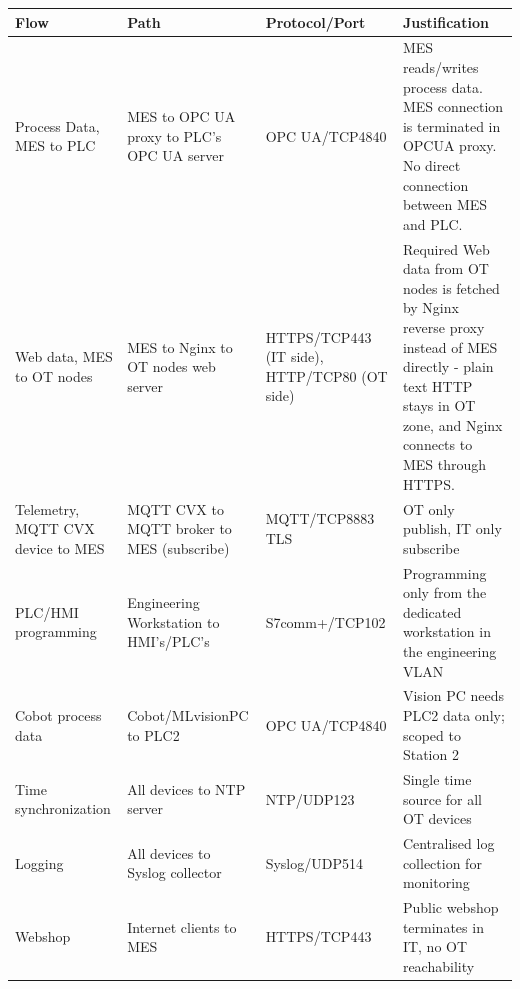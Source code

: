 \renewcommand{\arraystretch}{1.3} %
\begin{tabularx}{\textwidth}{p{2.5cm} X X X}
    \textbf{Flow} & \textbf{Path} & \textbf{Protocol/Port} & \textbf{Justification}  \vspace{0.5em}\\
\toprule
    Process Data, MES to PLC & MES to OPC UA proxy to PLC's  OPC UA server & OPC UA/TCP4840 & MES reads/writes process data. MES connection is terminated in OPCUA proxy. No direct connection between MES and PLC. \\
    \midrule
    Web data, MES to OT nodes & MES to Nginx to OT nodes web server & HTTPS/TCP443 (IT side), HTTP/TCP80 (OT side) & Required Web data from OT nodes is fetched by Nginx reverse proxy instead of MES directly - plain text HTTP stays in OT zone, and Nginx connects to MES through HTTPS. \\
    \midrule
    Telemetry, MQTT CVX device to MES & MQTT CVX to MQTT broker to MES (subscribe) & MQTT/TCP8883 TLS & OT only publish, IT only subscribe\\
    \midrule
    PLC/HMI programming & Engineering Workstation to HMI's/PLC's & S7comm+/TCP102 & Programming only from the dedicated workstation in the engineering VLAN \\
    \midrule
    Cobot process data & Cobot/MLvisionPC to PLC2 & OPC UA/TCP4840 & Vision PC needs PLC2 data only; scoped to Station 2 \\
    \midrule
    Time synchronization & All devices to NTP server & NTP/UDP123 & Single time source for all OT devices \\
    \midrule
    Logging & All devices to Syslog collector & Syslog/UDP514 & Centralised log collection for monitoring \\
    \midrule
    Webshop & Internet clients to MES & HTTPS/TCP443 & Public webshop terminates in IT, no OT reachability \\
\end{tabularx}


